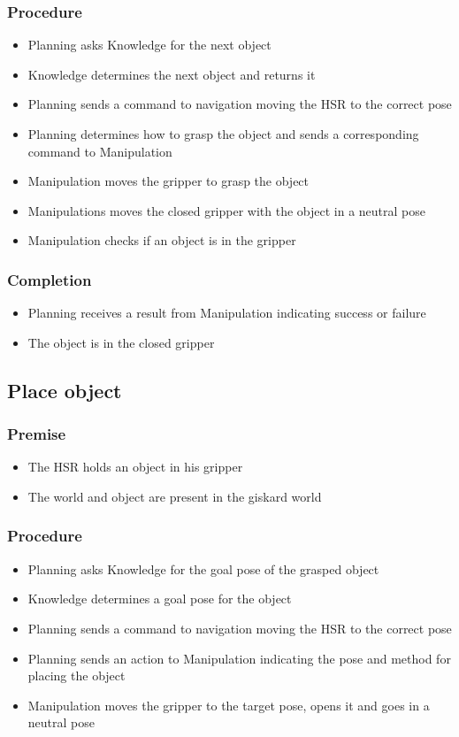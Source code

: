 \documentclass[main.tex]{subfiles}
\begin{document}
	\subsubsection{Procedure}
	\begin{itemize}			
		\item Planning asks Knowledge for the next object
		\item Knowledge determines the next object and returns it
		\item Planning sends a command to navigation moving the HSR to the correct pose
		\item Planning determines how to grasp the object and sends a corresponding command to Manipulation
		\item Manipulation moves the gripper to grasp the object
		\item Manipulations moves the closed gripper with the object in a neutral pose
		\item Manipulation checks if an object is in the gripper 				
	\end{itemize}
	
	\subsubsection{Completion}
	\begin{itemize}
		\item Planning receives a result from Manipulation indicating success or failure
		\item The object is in the closed gripper	
	\end{itemize}
	
	\subsection{Place object}
	
	\subsubsection{Premise}
	\begin{itemize}
		\item The HSR holds an object in his gripper
		\item The world and object are present in the giskard world
	\end{itemize} 
	
	\subsubsection{Procedure}
	\begin{itemize}			
		\item Planning asks Knowledge for the goal pose of the grasped object
		\item Knowledge determines a goal pose for the object
		\item Planning sends a command to navigation moving the HSR to the correct pose
		\item Planning sends an action to Manipulation indicating the pose and method for placing the object
		\item Manipulation moves the gripper to the target pose, opens it and goes in a neutral pose 				
	\end{itemize}
	
\end{document}
